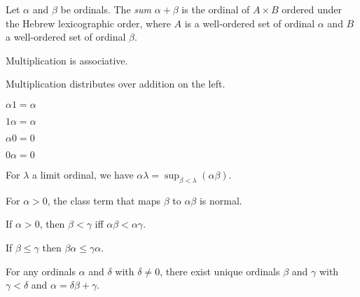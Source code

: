 \begin{definition}[Product]
    Let $\alpha$ and $\beta$ be ordinals. The \emph{sum}
$\alpha + \beta$ is the ordinal of $A \times B$ ordered under
the Hebrew
lexicographic order, where $A$ is a well-ordered set of ordinal $\alpha$
and $B$ a well-ordered set of ordinal $\beta$.
\end{definition}

\begin{theorem}
    Multiplication is associative.
\end{theorem}

\begin{theorem}
    Multiplication distributes over addition on the left.
\end{theorem}

\begin{theorem}
    $\alpha 1 = \alpha$
\end{theorem}

\begin{theorem}
    $1 \alpha = \alpha$
\end{theorem}

\begin{theorem}
    $\alpha 0 = 0$
\end{theorem}

\begin{theorem}
    $0 \alpha = 0$
\end{theorem}

\begin{theorem}
    For $\lambda$ a limit ordinal, we have $\alpha \lambda = \sup_{\beta < \lambda} (\alpha \beta)$.
\end{theorem}

\begin{theorem}
    For $\alpha > 0$, the class term that maps $\beta$ to $\alpha \beta$ is normal.
\end{theorem}

\begin{theorem}
    If $\alpha > 0$, then $\beta < \gamma$ iff $\alpha \beta < \alpha \gamma$.
\end{theorem}

\begin{theorem}
    If $\beta \leq \gamma$ then $\beta \alpha \leq \gamma \alpha$.
\end{theorem}

\begin{theorem}
For any ordinals $\alpha$ and $\delta$ with $\delta \neq 0$,
there exist unique ordinals $\beta$ and $\gamma$ with
$\gamma < \delta$ and $\alpha = \delta \beta + \gamma$.
\end{theorem}

